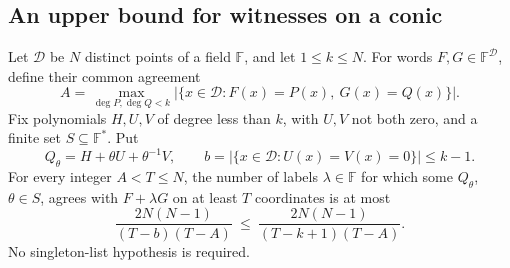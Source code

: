 \subsection{An upper bound for witnesses on a conic}
\label{subsec:conic-bank-bound}

\begin{theorem}\label{thm:conic-bank-bound}
Let $\mathcal D$ be $N$ distinct points of a field $\mathbb F$, and let
$1\le k\le N$. For words $F,G\in\mathbb F^{\mathcal D}$, define their
common agreement
\[
 A=\max_{\deg P,\deg Q<k}
   |\{x\in\mathcal D:F(x)=P(x),\ G(x)=Q(x)\}|.
\]
Fix polynomials $H,U,V$ of degree less than $k$, with $U,V$ not both zero,
and a finite set $S\subseteq\mathbb F^*$. Put
\[
 Q_\theta=H+\theta U+\theta^{-1}V,\qquad
 b=|\{x\in\mathcal D:U(x)=V(x)=0\}|\le k-1.
\]
For every integer $A<T\le N$, the number of labels $\lambda\in\mathbb F$
for which some $Q_\theta$, $\theta\in S$, agrees with $F+\lambda G$
on at least $T$ coordinates is at most
\begin{equation}\label{eq:conic-bank-bound}
 \frac{2N(N-1)}{(T-b)(T-A)}
 \ \le\ \frac{2N(N-1)}{(T-k+1)(T-A)}.
\end{equation}
No singleton-list hypothesis is required.
\end{theorem}

